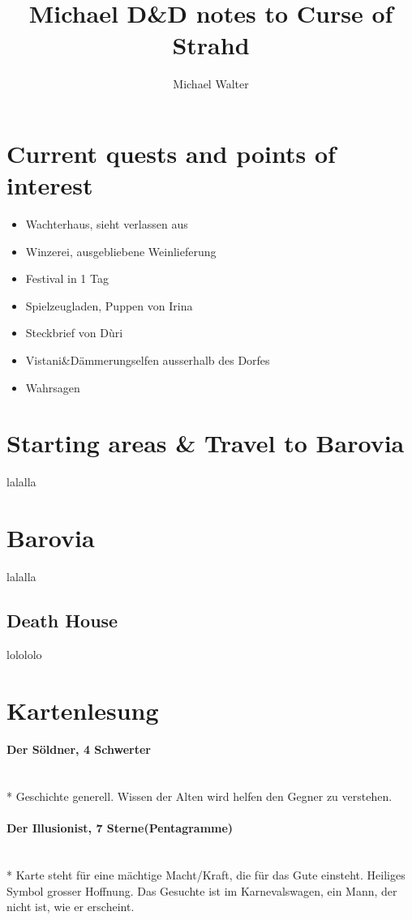 \documentclass{article}
\begin{document}
\title{Michael D\&D notes to Curse of Strahd}
\author{Michael Walter}
\maketitle
\section{Current quests and points of interest}
\begin{itemize}
	\item Wachterhaus, sieht verlassen aus
	\item Winzerei, ausgebliebene Weinlieferung
	\item Festival in 1 Tag
	\item Spielzeugladen, Puppen von Irina
	\item Steckbrief von Dùri
	\item Vistani\&Dämmerungselfen ausserhalb des Dorfes
	\item Wahrsagen
\end{itemize}
\section{Starting areas \& Travel to Barovia}
lalalla
\section{Barovia}
lalalla
\subsection{Death House}
lolololo
\section{Kartenlesung}
\paragraph{Der Söldner, 4 Schwerter} ~\\*
Geschichte generell. Wissen der Alten wird helfen den Gegner zu verstehen.
\paragraph{Der Illusionist, 7 Sterne(Pentagramme)} ~\\*
Karte steht für eine mächtige Macht/Kraft, die für das Gute einsteht. Heiliges Symbol grosser Hoffnung. Das Gesuchte ist im Karnevalswagen, ein Mann, der nicht ist, wie er erscheint.
\end{document}
